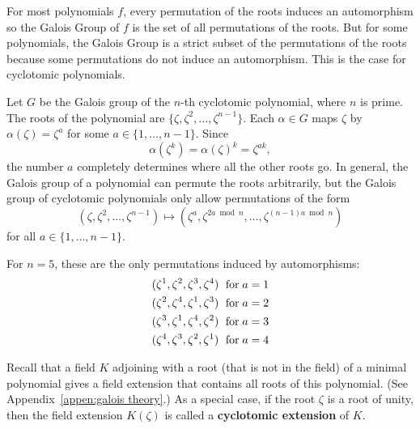 \documentclass[../main.tex]{subfiles}
\begin{document}
For most polynomials $f$, every permutation of the roots induces an automorphism so the Galois Group of $f$ is the set of all permutations of the roots. But for some polynomials, the Galois Group is a strict subset of the permutations of the roots because some permutations do not induce an automorphism. This is the case for cyclotomic polynomials.

Let $G$ be the Galois group of the $n$-th cyclotomic polynomial, where $n$ is prime. The roots of the polynomial are $\{\zeta, \zeta^2, \ldots, \zeta^{n-1} \}$.
Each $\alpha \in G$ maps $\zeta$ by $\alpha(\zeta) = \zeta^a$ for some $a \in \{1,\ldots,n-1\}$.
Since
\[ \alpha(\zeta^k) = \alpha(\zeta)^k = \zeta^{ak}, \]
the number $a$ completely determines where all the other roots go.
In general, the Galois group of a polynomial can permute the roots arbitrarily, but the Galois group of cyclotomic polynomials only allow permutations of the form
\[ (\zeta,\zeta^2,\ldots,\zeta^{n-1}) \mapsto (\zeta^a, \zeta^{2a \bmod n}, \ldots, \zeta^{(n-1)a \bmod n}) \]
for all $a \in \{1,\ldots,n-1\}$.

\begin{example}
For $n=5$, these are the only permutations induced by automorphisms:
\begin{gather*}
    (\zeta^1,\zeta^2,\zeta^3,\zeta^4) \;\textnormal{ for}\; a=1 \\
    (\zeta^2,\zeta^4,\zeta^1,\zeta^3) \;\textnormal{ for}\; a=2 \\
    (\zeta^3,\zeta^1,\zeta^4,\zeta^2) \;\textnormal{ for}\; a=3 \\
    (\zeta^4,\zeta^3,\zeta^2,\zeta^1) \;\textnormal{ for}\; a=4 
\end{gather*}
\end{example}

\iffalse
Recall that a field $K$ adjoining with a root (that is not in the field) of a minimal polynomial gives a field extension that contains all roots of this polynomial. (See Appendix~\ref{appen:galois theory}.) 
\reversemarginpar
{}
As a special case, if the root $\zeta$ is a root  of unity, then the field extension $K(\zeta)$ is called a \textbf{cyclotomic extension} of $K$. %
\end{document}

